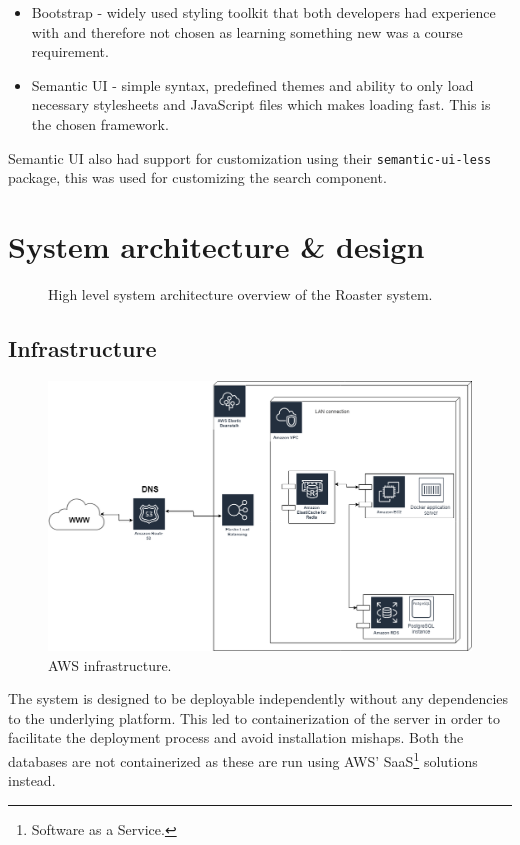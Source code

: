 \documentclass[12pt,a4paper]{report}
\begin{document}
\begin{itemize}
    \item Bootstrap - widely used styling toolkit that both developers had experience with and therefore not chosen as learning something new was a course requirement.
    \item Semantic UI - simple syntax, predefined themes and ability to only load necessary stylesheets and JavaScript files which makes loading fast. This is the chosen framework.
\end{itemize}

Semantic UI also had support for customization using their \texttt{semantic-ui-less} package, this was used for customizing the search component.

\chapter{System architecture \& design}
\begin{figure}[H]
    \centering
    
    \caption{High level system architecture overview of the Roaster system.}
\end{figure}

\section{Infrastructure}
\begin{figure}[H]
    \centering
    \includegraphics[width=16cm]{Cloud-infrastructure.png}
    \caption{AWS infrastructure.}
\end{figure}
The system is designed to be deployable independently without any dependencies to the  underlying platform. This led to containerization of the server in order to facilitate the deployment process and avoid installation mishaps. Both the databases are not containerized as these are run using AWS' SaaS\footnote{Software as a Service.} solutions instead.
\end{document}

